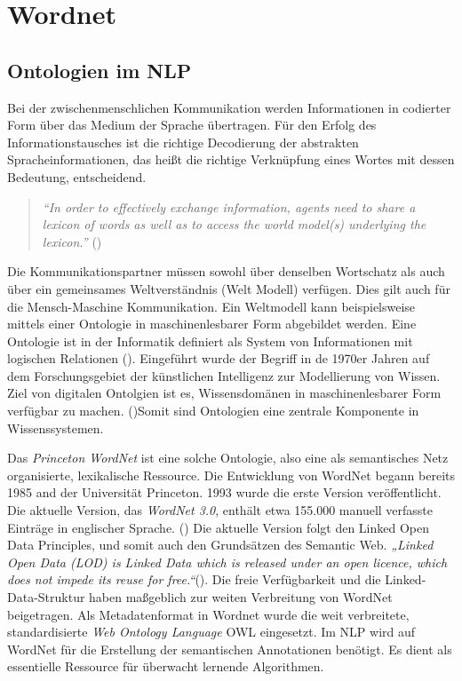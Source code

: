 \section{Wordnet}


\subsection{Ontologien im NLP}

Bei der zwischenmenschlichen Kommunikation werden Informationen in codierter Form über das Medium der Sprache übertragen. Für den Erfolg des Informationstausches ist die richtige Decodierung der abstrakten Spracheinformationen, das heißt die richtige Verknüpfung eines Wortes mit dessen Bedeutung, entscheidend. 
\begin{quote} \textit{"`In order to effectively exchange information, agents need to share a lexicon of words as well as to access the world model(s) underlying the lexicon."'} (\cite[vgl.][1]{OLTRAMANI})\end{quote} 
Die Kommunikationspartner müssen sowohl über denselben Wortschatz als auch über ein gemeinsames Weltverständnis (Welt Modell) verfügen. Dies gilt auch für die Mensch-Maschine Kommunikation. Ein Weltmodell kann beispielsweise mittels einer Ontologie in maschinenlesbarer Form abgebildet werden. Eine Ontologie ist in der Informatik definiert als System von Informationen mit logischen Relationen (\cite[vgl.][1]{DUDEN}). Eingeführt wurde der Begriff in de 1970er Jahren auf dem Forschungsgebiet der künstlichen Intelligenz zur Modellierung von Wissen. Ziel von digitalen Ontolgien ist es, Wissensdomänen in maschinenlesbarer Form verfügbar zu machen. (\cite[vgl.][7]{TACKE})Somit sind Ontologien eine zentrale Komponente in Wissenssystemen. 
\par
Das \textit{Princeton WordNet} ist eine solche Ontologie, also eine als semantisches Netz organisierte, lexikalische Ressource. Die Entwicklung von WordNet begann bereits 1985 and der Universität Princeton. 1993 wurde die erste Version veröffentlicht. Die aktuelle Version, das \textit{WordNet 3.0}, enthält etwa 155.000 manuell verfasste Einträge in englischer Sprache. (\cite[vgl.][1]{PRINCETON}) Die aktuelle Version folgt den Linked Open Data Principles, und somit auch den Grundsätzen des Semantic Web. \textit{„Linked Open Data (LOD) is Linked Data which is released under an open licence, which does not impede its reuse for free.“}(\cite[vgl.][1]{BERNERS_LEE}). Die freie Verfügbarkeit und die Linked-Data-Struktur haben maßgeblich zur weiten Verbreitung von WordNet beigetragen. Als Metadatenformat in Wordnet wurde die weit verbreitete, standardisierte \textit{Web Ontology Language} \ac{OWL} eingesetzt. Im \ac{NLP} wird auf WordNet für die Erstellung der semantischen Annotationen benötigt. Es dient als essentielle Ressource für überwacht lernende Algorithmen.
\par

